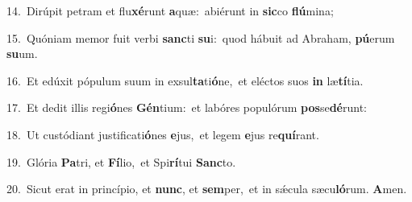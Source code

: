 {\numbfont\textcolor{\numbcolor}{14.}}~Dirúpit petram et flu\-\textbf{xé}\-runt \textbf{a}\-quæ:~\star abiérunt in \textbf{sic}\-co \textbf{flú}\-mina;\par
{\numbfont\textcolor{\numbcolor}{15.}}~Quóniam memor fuit verbi \textbf{sanc}\-ti \textbf{su}\-i:~\star quod hábuit ad Abraham, \textbf{pú}\-erum \textbf{su}\-um.\par
{\numbfont\textcolor{\numbcolor}{16.}}~Et edúxit pópulum suum in exsul\-\textbf{ta}\-ti\-\textbf{ó}\-ne,~\star et eléctos suos \textbf{in} læ\-\textbf{tí}\-tia.\par
{\numbfont\textcolor{\numbcolor}{17.}}~Et dedit illis regi\-\textbf{ó}\-nes \textbf{Gén}\-tium:~\star et labóres populórum \textbf{pos}\-se\-\textbf{dé}\-runt:\par
{\numbfont\textcolor{\numbcolor}{18.}}~Ut custódiant justificati\-\textbf{ó}\-nes \textbf{e}\-jus,~\star et legem \textbf{e}\-jus re\-\textbf{quí}\-rant.\par
{\numbfont\textcolor{\numbcolor}{19.}}~Glória \textbf{Pa}\-tri, et \textbf{Fí}\-lio,~\star et Spi\-\textbf{rí}\-tui \textbf{Sanc}\-to.\par
{\numbfont\textcolor{\numbcolor}{20.}}~Sicut erat in princípio, et \textbf{nunc}\-, et \textbf{sem}\-per,~\star et in sǽcula sæcu\-\textbf{ló}\-rum. \textbf{A}\-men.\par
